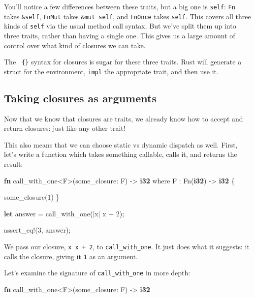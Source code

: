 \documentclass[a4paper,]{book}
\newenvironment{Shaded}{\begin{snugshade}}{\end{snugshade}}
\newcommand{\KeywordTok}[1]{\textcolor[rgb]{0.13,0.29,0.53}{\textbf{{#1}}}}
\newcommand{\DecValTok}[1]{\textcolor[rgb]{0.00,0.00,0.81}{{#1}}}
\newcommand{\OtherTok}[1]{\textcolor[rgb]{0.56,0.35,0.01}{{#1}}}
\newcommand{\NormalTok}[1]{{#1}}
\begin{document}
You'll notice a few differences between these traits, but a big one is
\texttt{self}: \texttt{Fn} takes \texttt{\&self}, \texttt{FnMut} takes
\texttt{\&mut\ self}, and \texttt{FnOnce} takes \texttt{self}. This
covers all three kinds of \texttt{self} via the usual method call
syntax. But we've split them up into three traits, rather than having a
single one. This gives us a large amount of control over what kind of
closures we can take.

The \texttt{\textbar{}\textbar{}\ \{\}} syntax for closures is sugar for
these three traits. Rust will generate a struct for the environment,
\texttt{impl} the appropriate trait, and then use it.

\subsection{Taking closures as
arguments}\label{taking-closures-as-arguments}

Now that we know that closures are traits, we already know how to accept
and return closures: just like any other trait!

This also means that we can choose static vs dynamic dispatch as well.
First, let's write a function which takes something callable, calls it,
and returns the result:

\begin{Shaded}
\begin{Highlighting}[]
\KeywordTok{fn} \NormalTok{call_with_one<F>(some_closure: F) -> }\KeywordTok{i32}
    \NormalTok{where F : Fn(}\KeywordTok{i32}\NormalTok{) -> }\KeywordTok{i32} \NormalTok{\{}

    \NormalTok{some_closure(}\DecValTok{1}\NormalTok{)}
\NormalTok{\}}

\KeywordTok{let} \NormalTok{answer = call_with_one(|x| x + }\DecValTok{2}\NormalTok{);}

\OtherTok{assert_eq!}\NormalTok{(}\DecValTok{3}\NormalTok{, answer);}
\end{Highlighting}
\end{Shaded}

We pass our closure, \texttt{\textbar{}x\textbar{}\ x\ +\ 2}, to
\texttt{call\_with\_one}. It just does what it suggests: it calls the
closure, giving it \texttt{1} as an argument.

Let's examine the signature of \texttt{call\_with\_one} in more depth:

\begin{Shaded}
\begin{Highlighting}[]
\KeywordTok{fn} \NormalTok{call_with_one<F>(some_closure: F) -> }\KeywordTok{i32}
\end{Highlighting}
\end{Shaded}
\end{document}
